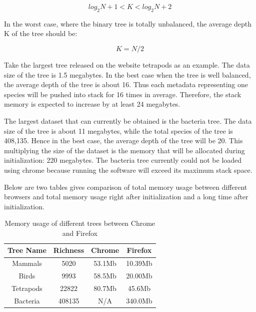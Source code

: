 \documentclass[a4paper,11pt,twoside]{report}
\begin{document}
\begin{equation*}
log_2 N + 1 < K < log_2 N + 2
\end{equation*}

In the worst case, where the binary tree is totally unbalanced, the average depth K of the tree should be:

 \begin{equation*}
	K = N/2
\end{equation*}

Take the largest tree released on the website tetrapods as an example. The data size of the tree is 1.5 megabytes. In the best case when the tree is well balanced, the average depth of the tree is about 16. Thus each metadata representing one species will be pushed into stack for 16 times in average. Therefore, the stack memory is expected to increase by at least 24 megabytes.

 The largest dataset that can currently be obtained is the bacteria tree. The data size of the tree is about 11 megabytes, while the total species of the tree is 408,135. Hence in the best case, the average depth of the tree will be 20. This multiplying the size of the dataset is the memory that will be allocated during initialization: 220 megabytes. The bacteria tree currently could not be loaded using chrome because running the software will exceed its maximum stack space. 
 
 Below are two tables gives comparison of total memory usage between different browsers and total memory usage right after initialization and a long time after initialization.
 
 \begin{table} [H]
	\centering %
	\begin{tabular}{|c c c c|} %
		\hline %
		Tree Name & Richness  & Chrome & Firefox\\ %
		\hline  %
		Mammals & 5020 &  53.1Mb & 10.39Mb\\  %
		\hline
		Birds & 9993 &  58.5Mb & 20.00Mb\\
		\hline
		Tetrapods & 22822 & 80.7Mb & 45.6Mb\\ 
		\hline %
		Bacteria & 408135 & N/A & 340.0Mb \\ [1ex] %
		\hline
	\end{tabular}
	\label{table:nonlin} %
	\caption{Memory usage of different trees between Chrome and Firefox} %
\end{table}
\end{document}
